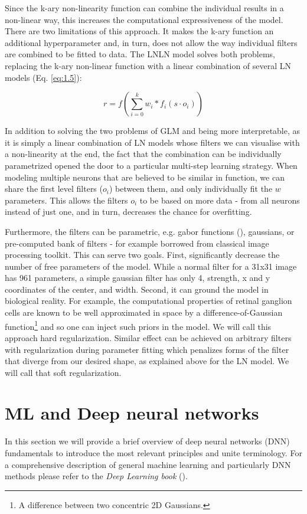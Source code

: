 Since the k-ary non-linearity function can combine the individual results in a non-linear way, this increases the computational expressiveness of the model. There are two limitations of this approach. It makes the k-ary function an additional hyperparameter and, in turn, does not allow the way individual filters are combined to be fitted to data. The LNLN model solves both problems, replacing the k-ary non-linear function with a linear combination of several LN models (Eq. \ref{eq:1.5}):

\begin{equation}\label{eq:1.5}
    r = f(\sum_{i=0}^{k} w_i * f_i(s \cdot o_i))
\end{equation}

In addition to solving the two problems of GLM and being more interpretable, as it is simply a linear combination of LN models whose filters we can visualise with a non-linearity at the end, the fact that the combination can be individually parametrized opened the door to a particular multi-step learning strategy. When modeling multiple neurons that are believed to be similar in function, we can share the first level filters ($o_i$) between them, and only individually fit the $w$ parameters. This allows the filters $o_i$ to be based on more data - from all neurons instead of just one, and in turn, decreases the chance for overfitting.

\label{intr:hard-reg}\label{intr:soft-reg}Furthermore, the filters can be parametric, e.g. gabor functions (\cite{Kay2008}), gaussians, or pre-computed bank of filters - for example borrowed from classical image processing toolkit. This can serve two goals. First, significantly decrease the number of free parameters of the model. While a normal filter for a 31x31 image has 961 parameters, a simple gaussian filter has only 4, strength, x and y coordinates of the center, and width. Second, it can ground the model in biological reality. For example, the computational properties of retinal ganglion cells are known to be well approximated in space by a difference-of-Gaussian function\footnote{A difference between two concentric 2D Gaussians.} and so one can inject such priors in the model. We will call this approach hard regularization. Similar effect can be achieved on arbitrary filters with regularization during parameter fitting which penalizes forms of the filter that diverge from our desired shape, as explained above for the LN model. We will call that soft regularization.

\section{ML and Deep neural networks}
In this section we will provide a brief overview of deep neural networks (DNN) fundamentals to introduce the most relevant principles and unite terminology. For a comprehensive description of general machine learning and particularly DNN methods please refer to the \textit{Deep Learning book} (\cite{Goodfellow-et-al-2016}).


